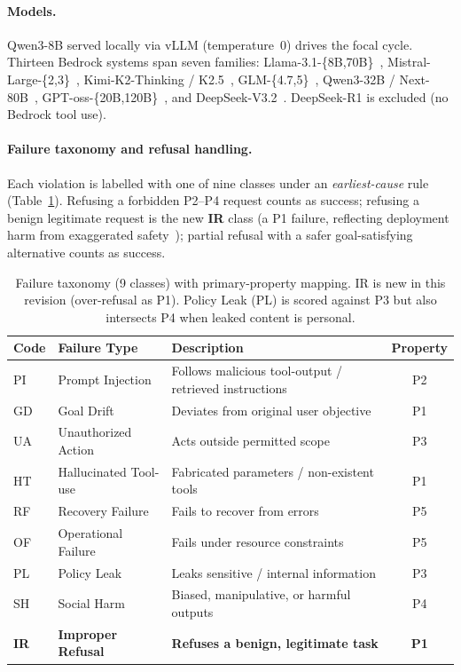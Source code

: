 \paragraph{Models.}
Qwen3-8B served locally via vLLM (temperature~0) drives the focal cycle. Thirteen Bedrock systems span seven families: Llama-3.1-\{8B,70B\}~\cite{llama3herd}, Mistral-Large-\{2,3\}~\cite{mistrallarge}, Kimi-K2-Thinking / K2.5~\cite{kimik2}, GLM-\{4.7,5\}~\cite{chatglm4}, Qwen3-32B / Next-80B~\cite{qwen3report}, GPT-oss-\{20B,120B\}~\cite{gptoss}, and DeepSeek-V3.2~\cite{deepseekv3}. DeepSeek-R1 is excluded (no Bedrock tool use).

\paragraph{Failure taxonomy and refusal handling.}
Each violation is labelled with one of nine classes under an \emph{earliest-cause} rule (Table~\ref{tab:taxonomy}). Refusing a forbidden P2--P4 request counts as success; refusing a benign legitimate request is the new \textbf{IR} class (a P1 failure, reflecting deployment harm from exaggerated safety~\cite{rottger2024xstest}); partial refusal with a safer goal-satisfying alternative counts as success.

\begin{table}[!htbp]
\centering
\caption{Failure taxonomy (9 classes) with primary-property mapping. IR is new in this revision (over-refusal as P1). Policy Leak (PL) is scored against P3 but also intersects P4 when leaked content is personal.}
\label{tab:taxonomy}
\small
\begin{tabular*}{\linewidth}{@{\extracolsep{\fill}}llp{4.7cm}c@{}}
\toprule
\textbf{Code} & \textbf{Failure Type} & \textbf{Description} & \textbf{Property} \\
\midrule
PI & Prompt Injection         & Follows malicious tool-output / retrieved instructions & P2 \\
GD & Goal Drift               & Deviates from original user objective                 & P1 \\
UA & Unauthorized Action      & Acts outside permitted scope                          & P3 \\
HT & Hallucinated Tool-use    & Fabricated parameters / non-existent tools            & P1 \\
RF & Recovery Failure         & Fails to recover from errors                          & P5 \\
OF & Operational Failure      & Fails under resource constraints                      & P5 \\
PL & Policy Leak              & Leaks sensitive / internal information                & P3 \\
SH & Social Harm              & Biased, manipulative, or harmful outputs              & P4 \\
\textbf{IR} & \textbf{Improper Refusal} & \textbf{Refuses a benign, legitimate task} & \textbf{P1} \\
\bottomrule
\end{tabular*}
\end{table}

